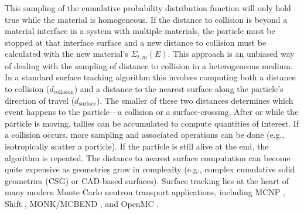 This sampling of the cumulative probability distribution function will only hold true while the material is homogeneous.
If the distance to collision is beyond a material interface in a system with multiple materials, the particle must be stopped at that interface surface and a new distance to collision must be calculated with the new material's $\Sigma_{t,m}(E)$.
This approach is an unbiased way of dealing with the sampling of distance to collision in a heterogeneous medium.
In a standard surface tracking algorithm this involves computing both a distance to collision ($d_{\text{collision}}$) and a distance to the nearest surface along the particle's direction of travel ($d_{\text{surface}}$).
The smaller of these two distances determines which event happens to the particle---a collision or a surface-crossing.
After or while the particle is moving, tallies can be accumulated to compute quantities of interest.
If a collision occurs, more sampling and associated operations can be done (e.g., isotropically scatter a particle).
If the particle is still alive at the end, the algorithm is repeated.
The distance to nearest surface computation can become quite expensive as geometries grow in complexity (e.g., complex cumulative solid geometries (CSG) or CAD-based surfaces).
Surface tracking lies at the heart of many modern Monte Carlo neutron transport applications, including MCNP \cite{MCNP_RisingArmstrongEtAl}, Shift \cite{hamilton_continuous-energy_2019, pandya_implementation_2016}, MONK/MCBEND \cite{richards_monk_2015}, and OpenMC \cite{romano_openmc_2015}.

